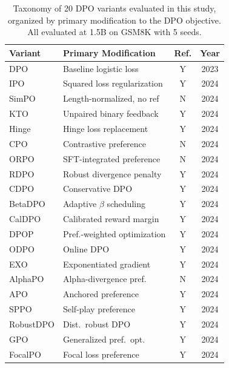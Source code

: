 \documentclass{article}
\begin{document}
\begin{table}[ht]
\centering
\caption{Taxonomy of 20 DPO variants evaluated in this study, organized by primary modification to the DPO objective. All evaluated at 1.5B on GSM8K with 5 seeds.}
\label{tab:dpo_taxonomy}
\small
\begin{tabular}{@{}llcc@{}}
\toprule
\textbf{Variant} & \textbf{Primary Modification} & \textbf{Ref.} & \textbf{Year} \\
\midrule
DPO & Baseline logistic loss & Y & 2023 \\
IPO & Squared loss regularization & Y & 2024 \\
SimPO & Length-normalized, no ref & N & 2024 \\
KTO & Unpaired binary feedback & Y & 2024 \\
Hinge & Hinge loss replacement & Y & 2024 \\
CPO & Contrastive preference & N & 2024 \\
ORPO & SFT-integrated preference & N & 2024 \\
RDPO & Robust divergence penalty & Y & 2024 \\
CDPO & Conservative DPO & Y & 2024 \\
BetaDPO & Adaptive $\beta$ scheduling & Y & 2024 \\
CalDPO & Calibrated reward margin & Y & 2024 \\
DPOP & Pref.-weighted optimization & Y & 2024 \\
ODPO & Online DPO & Y & 2024 \\
EXO & Exponentiated gradient & Y & 2024 \\
AlphaPO & Alpha-divergence pref. & N & 2024 \\
APO & Anchored preference & Y & 2024 \\
SPPO & Self-play preference & Y & 2024 \\
RobustDPO & Dist.\ robust DPO & Y & 2024 \\
GPO & Generalized pref.\ opt. & Y & 2024 \\
FocalPO & Focal loss preference & Y & 2024 \\
\bottomrule
\end{tabular}
\end{table}
\end{document}
